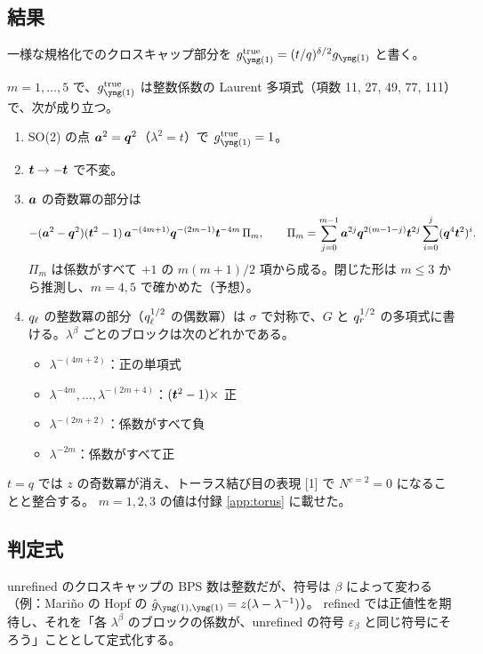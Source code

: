 \subsection{結果}
一様な規格化でのクロスキャップ部分を $g^{\mathrm{true}}_{\yone} = (t/q)^{\delta/2} g_{\yone}$ と書く。
\begin{compresult}\label{cr:torus}
$m = 1, \dots, 5$ で、$g^{\mathrm{true}}_{\yone}$ は整数係数の Laurent 多項式（項数 11, 27, 49, 77, 111）で、次が成り立つ。
\begin{enumerate}
\item[(N)] SO(2) の点 $\bm{a}^2 = \bm{q}^2$（$\lambda^2 = t$）で $g^{\mathrm{true}}_{\yone} = 1$。
\item[(P)] $\bm{t} \to -\bm{t}$ で不変。
\item[($c{=}2$)] $\bm{a}$ の奇数冪の部分は
\[
-(\bm{a}^2 - \bm{q}^2)(\bm{t}^2 - 1)\,\bm{a}^{-(4m+1)}\bm{q}^{-(2m-1)}\bm{t}^{-4m}\,\Pi_m,\qquad
\Pi_m = \sum_{j=0}^{m-1}\bm{a}^{2j}\bm{q}^{2(m-1-j)}\bm{t}^{2j}\sum_{i=0}^{j}(\bm{q}^4\bm{t}^2)^i .
\]
$\Pi_m$ は係数がすべて $+1$ の $m(m+1)/2$ 項から成る。閉じた形は $m \le 3$ から推測し、$m = 4, 5$ で確かめた（予想）。
\item[($c{=}1$)] $q_\ell$ の整数冪の部分（$q_\ell^{1/2}$ の偶数冪）は $\sigma$ で対称で、$G$ と $q_r^{1/2}$ の多項式に書ける。$\lambda^\beta$ ごとのブロックは次のどれかである。
  \begin{itemize}
  \item $\lambda^{-(4m+2)}$：正の単項式
  \item $\lambda^{-4m}, \dots, \lambda^{-(2m+4)}$：$(\bm{t}^2 - 1)\times$ 正
  \item $\lambda^{-(2m+2)}$：係数がすべて負
  \item $\lambda^{-2m}$：係数がすべて正
  \end{itemize}
\end{enumerate}
\end{compresult}
$t = q$ では $z$ の奇数冪が消え、トーラス結び目の表現 [1] で $N^{c=2} = 0$ になることと整合する。
$m = 1, 2, 3$ の値は付録 \ref{app:torus} に載せた。

\subsection{判定式}\label{sec:criterion}
unrefined のクロスキャップの BPS 数は整数だが、符号は $\beta$ によって変わる（例：Mariño の Hopf の $\hat g_{\yone,\yone} = z(\lambda - \lambda^{-1})$）。
refined では正値性を期待し、それを「各 $\lambda^\beta$ のブロックの係数が、unrefined の符号 $\varepsilon_\beta$ と同じ符号にそろう」こととして定式化する。

